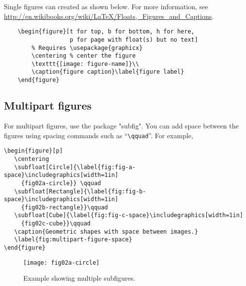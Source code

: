Single figures can created as shown below.
For more information, see \\ \href{http://en.wikibooks.org/wiki/LaTeX/Floats,_Figures_and_Captions}{http://en.wikibooks.org/wiki/LaTeX/Floats,\_Figures\_and\_Captions}.

\begin{verbatim}
    \begin{figure}[t for top, b for bottom, h for here, 
                   p for page with float(s) but no text]
        % Requires \usepackage{graphicx}
        \centering % center the figure
        \texttt{[image: figure-name]}\\
        \caption{figure caption}\label{figure label}
    \end{figure}
\end{verbatim}

\subsection{Multipart figures}

For multipart figures, use the package "subfig". You can
add space between the figures using spacing commands such as ``\verb|\qquad|''. For example, 

\begin{verbatim}
\begin{figure}[p]
   \centering
   \subfloat[Circle]{\label{fig:fig-a-space}\includegraphics[width=1in]
     {fig02a-circle}} \qquad
   \subfloat[Rectangle]{\label{fig:fig-b-space}\includegraphics[width=1in]
     {fig02b-rectangle}}\qquad
   \subfloat[Cube]{\label{fig:fig-c-space}\includegraphics[width=1in]
     {fig02c-cube}}\qquad
   \caption{Geometric shapes with space between images.}
   \label{fig:multipart-figure-space}
\end{figure} 
\end{verbatim}

\begin{figure}[p]
  \centering
  \texttt{[image: fig02a-circle]}\\
  \caption{Simple figure example.}\label{fig:simple_example}

  \vskip 20pt

   \qquad
  \qquad
  \qquad
  \caption{Example showing multiple subfigures.}
  \label{fig:multipart-figure-space}
\end{figure} 

